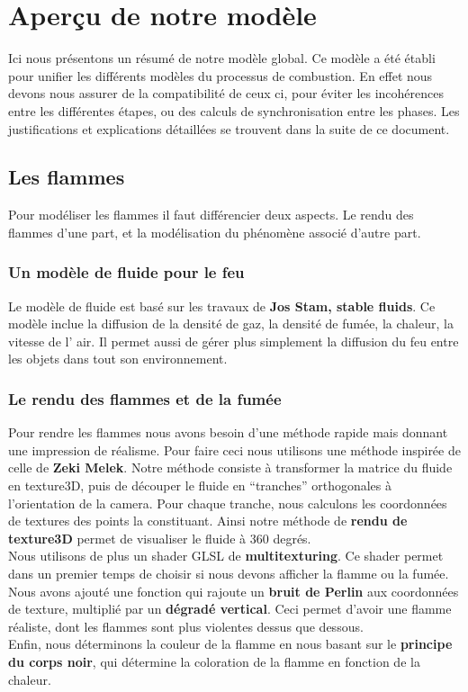 \documentclass[a4paper,10pt]{article}
\begin{document}
\newpage
\section{Aperçu de notre modèle}
Ici nous présentons un résumé de notre modèle global. Ce modèle a été
établi pour unifier les différents modèles du processus de combustion. 
En effet nous devons nous assurer de la compatibilité de ceux ci, pour éviter les incohérences entre les
différentes étapes, ou des calculs de synchronisation entre les
phases. Les justifications et explications détaillées se trouvent dans la suite de ce document.

\subsection{Les flammes}
Pour modéliser les flammes il faut différencier deux aspects. Le rendu
des flammes d'une part, et la modélisation du phénomène associé
d'autre part.

\subsubsection{Un modèle de fluide pour le feu}
Le modèle de fluide est basé sur les travaux de \textbf{Jos Stam, stable fluids}. 
Ce modèle inclue la diffusion de la densité de gaz, la densité de fumée, la chaleur, 
la vitesse de l' air. Il permet aussi de gérer plus
simplement la diffusion du feu entre les objets dans tout son environnement.

\subsubsection{Le rendu des flammes et de la fumée}
Pour rendre les flammes nous avons besoin d'une méthode rapide mais
donnant une impression de réalisme. Pour faire ceci nous utilisons une
méthode inspirée de celle de \textbf{Zeki Melek}. Notre méthode consiste à
transformer la matrice du fluide en texture3D, puis de découper le fluide en 
``tranches'' orthogonales à l'orientation de la camera. Pour chaque tranche,
nous calculons les coordonnées de textures des points la constituant. 
Ainsi notre méthode de \textbf{rendu de texture3D} permet de visualiser le fluide
à 360 degrés.\\
Nous utilisons de plus un shader GLSL de \textbf{multitexturing}. Ce shader
permet dans un premier temps de choisir si nous devons afficher la flamme ou la
fumée. Nous avons ajouté une fonction qui rajoute un \textbf{bruit de Perlin}
aux coordonnées de texture, multiplié par un \textbf{dégradé vertical}. Ceci
permet d'avoir une flamme réaliste, dont les flammes sont plus violentes
dessus que dessous.\\
Enfin, nous déterminons la couleur de la flamme en nous basant sur le
\textbf{principe du corps noir}, qui détermine la coloration de la flamme
en fonction de la chaleur.
\end{document}
